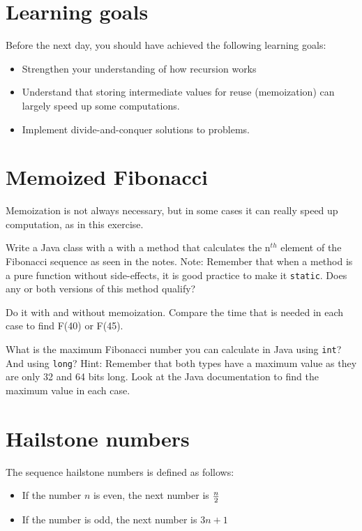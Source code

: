 \documentclass{article}
\begin{document}
\section*{Learning goals}
\label{sec:learning-goals}

Before the next day, you should have achieved the following learning
goals: 

\begin{itemize}
\item Strengthen your understanding of how recursion works
\item Understand that storing intermediate values for reuse
  (memoization) can largely speed up some computations. 
\item Implement divide-and-conquer solutions to problems. 
\end{itemize}

\section{Memoized Fibonacci}

Memoization is not always necessary, but in some cases it can really
speed up computation, as in this exercise. 

Write a Java class with a with a method that calculates 
the n$^{th}$ element of the Fibonacci sequence as seen in the notes.
Note: Remember that when a method is a pure function
without side-effects, it is good practice to make it
\verb+static+. Does any or both versions of this method qualify?

Do it with and without memoization. Compare
the time that is needed in each case to find F(40) or F(45). 

What is the maximum Fibonacci number you can calculate in Java using
\verb+int+? And using \verb+long+? Hint: Remember that both types have
a maximum value as they are only 32 and 64 bits long. Look at the Java
documentation to find the maximum value in each case. 


\section{Hailstone numbers}
\label{sec:hailstone-numbers}

The sequence hailstone numbers is defined as follows:

\begin{itemize}
\item If the number $n$ is even, the next number is $n \over 2$
\item If the number is odd, the next number is $3n + 1$
\end{itemize}
\end{document}
